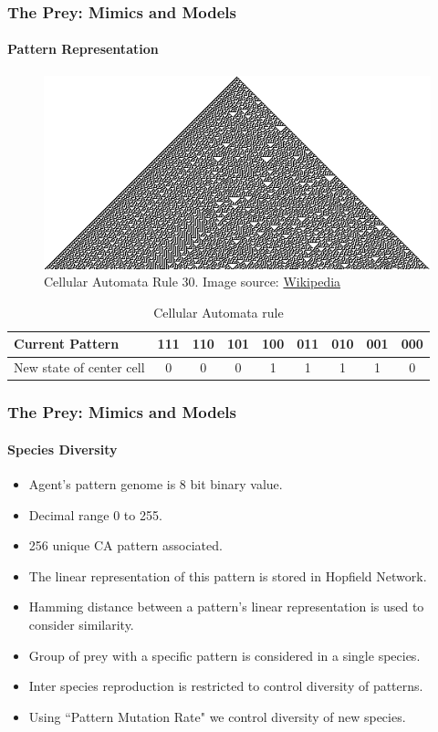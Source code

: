\frame
{
	\frametitle{The Prey: Mimics and Models}
	\framesubtitle{Pattern Representation}

	\begin{figure}[H]
		\centering
		\includegraphics[scale=3]{../tex/images/CA_rule30s}
		\caption{Cellular Automata Rule 30.
		Image source: \href{http://en.wikipedia.org/wiki/Cellular_automata}{Wikipedia}}
		\label{fig:cellular-automata-rule-30}
	\end{figure}
	
	\begin{table}
		\centering
		\begin{scriptsize}
		\begin{tabular}{| p{2cm} | c | c | c | c | c | c | c | c |}
		  \hline
		  Current Pattern & 111 & 110 & 101 & 100 & 011 & 010 & 001 & 000 \\ \hline
		  New state of center cell & 0 & 0 & 0 & 1 & 1 & 1 & 1 & 0 \\
		  \hline
		\end{tabular}
		\end{scriptsize}		
		\caption{Cellular Automata rule}
		\label{tab:cellular-automata-rule}
	\end{table}
}

\frame
{
	\frametitle{The Prey: Mimics and Models}
	\framesubtitle{Species Diversity}

	\begin{itemize}
		\item Agent's pattern genome is 8 bit binary value.
		\item Decimal range 0 to 255.
		\item 256 unique CA pattern associated.
		\item The linear representation of this pattern is stored in Hopfield Network.
		\item Hamming distance between a pattern's linear representation is used to consider similarity.
		\item Group of prey with a specific pattern is considered in a single species.
		\item Inter species reproduction is restricted to control diversity of patterns.
		\item Using ``Pattern Mutation Rate" we control diversity of new species.
	\end{itemize}
}

